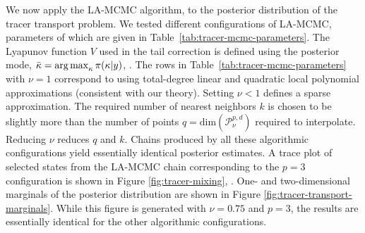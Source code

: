 We now apply the LA-MCMC algorithm,  to the posterior distribution of the tracer transport problem.  We tested different configurations of LA-MCMC, parameters of which are given in Table~\ref{tab:tracer-mcmc-parameters}. The Lyapunov function $V$ used in the tail correction is defined using the posterior mode, $\bar{\kappa} = \operatorname*{arg\,max}_{\kappa}{\pi(\kappa \vert y)}$, . The rows in Table~\ref{tab:tracer-mcmc-parameters} with $\nu =1$ correspond to using total-degree linear and quadratic local polynomial approximations (consistent with our theory). Setting $\nu < 1$ defines a sparse approximation. The required number of nearest neighbors $k$ is chosen to be slightly more than the number of points $q = \text{dim}(\mathcal{P}_\nu^{p,d}) $ required to interpolate. 
Reducing $\nu$ reduces $q$ and $k$. Chains produced by all these algorithmic configurations yield essentially identical posterior estimates. A trace plot of selected states from the LA-MCMC chain corresponding to the $p=3$ configuration is shown in  Figure \ref{fig:tracer-mixing}, . One- and two-dimensional marginals of the posterior distribution are shown in Figure \ref{fig:tracer-transport-marginals}. While this figure is generated with $\nu=0.75$ and $p=3$, the results are essentially identical for the other algorithmic configurations.  %
